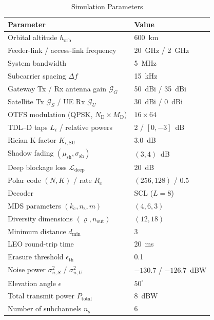 \documentclass[lettersize,journal]{IEEEtran}
\begin{document}
\begin{table}[t]
\centering
\caption{Simulation Parameters}
\label{tab:sim_params}
\begin{tabular}{@{}ll@{}}
\toprule
\textbf{Parameter} & \textbf{Value} \\
\midrule
Orbital altitude $h_{\mathrm{orb}}$ & 600~km \\
Feeder-link / access-link frequency & 20~GHz / 2~GHz \\
System bandwidth & 5~MHz \\
Subcarrier spacing $\Delta f$ & 15~kHz \\
Gateway Tx / Rx antenna gain $\mathcal{G}_G$ & 50~dBi / 35~dBi \\
Satellite Tx $\mathcal{G}_S$ / UE Rx $\mathcal{G}_U$ & 30~dBi / 0~dBi \\
OTFS modulation (QPSK, $N_{\mathrm{D}} \times M_{\mathrm{D}}$) & $16 \times 64$ \\
TDL--D taps $L_i$ / relative powers & 2 / $[0, -3]$~dB \\
Rician K-factor $K_{i,\mathrm{SU}}$ & 3.0~dB \\
Shadow fading $(\mu_{\mathrm{sh}}, \sigma_{\mathrm{sh}})$ & $(3, 4)$~dB \\
Deep blockage loss $\mathcal{L}_{\mathrm{deep}}$ & 20~dB \\
Polar code $(N, K)$ / rate $R_c$ & $(256, 128)$ / $0.5$ \\
Decoder & SCL ($L = 8$) \\
MDS parameters $(k_{\mathrm{c}}, n_{\mathrm{s}}, m)$ & $(4, 6, 3)$ \\
Diversity dimensions $(\varrho, n_{\text{out}})$ & $(12, 18)$ \\
Minimum distance $d_{\min}$ & 3 \\
LEO round-trip time  & 20~ms \\
Erasure threshold $\epsilon_{\mathrm{th}}$ & 0.1 \\
Noise power $\sigma_{n,S}^2$ / $\sigma_{n,U}^2$ & $-130.7$ / $-126.7$~dBW \\
Elevation angle $\epsilon$ & $50^{\circ}$ \\
Total transmit power $P_{\mathrm{total}}$ & 8~dBW \\
Number of subchannels $n_{\mathrm{s}}$ & 6 \\
\bottomrule
\end{tabular}
\end{table}
\end{document}
